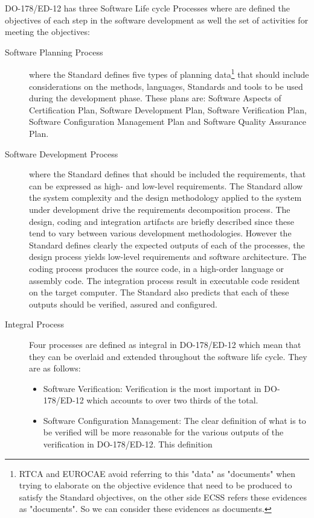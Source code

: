 DO-178/ED-12 has three Software Life cycle Processes where are defined the objectives of each step in the software development as well
the set of activities for meeting the objectives:
\begin{description}
\item[Software Planning Process] where the Standard defines five types of planning data\footnote{\ac{RTCA} and \ac{EUROCAE} avoid referring to this "data" as
"documents" when trying to elaborate on the objective evidence that need to be produced to satisfy the Standard objectives\cite{avionics}, on the other side \ac{ECSS} refers
these evidences as "documents". So we can consider these evidences as documents.} that should include
considerations on the methods, languages, Standards and tools to be used during the development phase. These plans are: Software Aspects of
Certification Plan,
Software Development Plan, Software Verification Plan, Software Configuration Management Plan and Software Quality Assurance Plan.
\item[Software Development Process] where the Standard defines that should be included the requirements, that can be
expressed as high- and low-level requirements\cite{avionics,ed-12b}. The Standard allow the system complexity and the design methodology applied to the system under development
drive the requirements decomposition process. The design, coding and integration artifacts are briefly described since these tend to vary between various development methodologies.
However the Standard defines clearly the expected outputs of each of the processes, the design process yields low-level requirements and software architecture.
The coding process produces the source code, in a high-order language or assembly code. The integration process result in executable code
resident on the target computer. The Standard also predicts that each of these outputs should be verified, assured and configured.
\item[Integral Process] Four processes are defined as integral in DO-178/ED-12 which
mean that they can be overlaid and extended throughout the
software life cycle. They are as follows:
\begin{itemize}
\item Software Verification: Verification is the most important
in DO-178/ED-12 which accounts to over two thirds of the total.
\item Software Configuration Management: The clear definition
of what is to be verified will be more reasonable for the
various outputs of the verification in DO-178/ED-12. This definition

\end{itemize}
\end{description}
